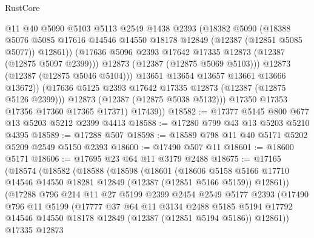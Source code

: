 \begin{lexlean}{RustCore}
\begin{coremodule}
                    @11
                    @40
                    @5090
                    @5103
                    @5113
                    @2549
                    @1438
                    @2393
                    (@18382
                      @5090
                      (@18388
                        @5076
                        @5085
                        @17616
                        @14546
                        @14550
                        @18178
                        @12849
                        (@12387 (@12851 @5085 @5077))
                        @12861))
                    (@17636 @5096 @2393 @17642 @17335 @12873 (@12387 (@12875 @5097 @2399)))
                    @12873
                    (@12387 (@12875 @5069 @5103)))
                  @12873
                  (@12387 (@12875 @5046 @5104)))
                @13651
                @13654
                @13657
                @13661
                @13666
                @13672))
            (@17636 @5125 @2393 @17642 @17335 @12873 (@12387 (@12875 @5126 @2399)))
            @12873
            (@12387 (@12875 @5038 @5132)))
          @17350
          @17353
          @17356
          @17360
          @17365
          @17371)
        @17439))
@18582 := @17377 @5145 @800 @677 @13 @5203 @5212 @2399 @4413
@18588 := @17280 @799 @43 @13 @5203 @5210 @4395
@18589 := @17288 @507
@18598 := @18589 @798 @11 @40 @5171 @5202 @5209 @2549 @5150 @2393
@18600 := @17490 @507 @11
@18601 := @18600 @5171
@18606 := @17695 @23 @64 @11 @3179 @2488
@18675 := @17165
    (@18574
      (@18582
        (@18588
          (@18598
            (@18601
              (@18606
                @5158
                @5166
                @17710
                @14546
                @14550
                @18281
                @12849
                (@12387 (@12851 @5166 @5159))
                @12861))
            (@17288
              @796
              @214
              @11
              @27
              @5199
              @2399
              @2454
              @2549
              @5177
              @2393
              (@17490
                @796
                @11
                @5199
                (@17777
                  @37
                  @64
                  @11
                  @3134
                  @2488
                  @5185
                  @5194
                  @17792
                  @14546
                  @14550
                  @18178
                  @12849
                  (@12387 (@12851 @5194 @5186))
                  @12861))
              @17335
              @12873

\end{coremodule}
\end{lexlean}
